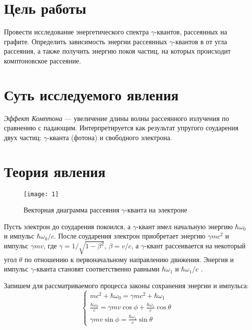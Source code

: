 \documentclass[a4paper, 12pt]{article}
\begin{document}

\section{Цель работы}
Провести исследование энергетического спектра
$\gamma$-квантов, рассеянных на графите. Определить зависимость
энергии рассеянных $\gamma$-квантов в от угла рассеяния, а также
получить энергию покоя частиц, на которых происходит комптоновское
рассеяние.



\section{Суть исследуемого явления}
\emph{Эффект Комптона} --- увеличение длины волны рассеянного
излучения по сравнению с падающим. Интерпретируется как результат
упругого соударения двух частиц: $\gamma$-кванта (фотона) и свободного
электрона.



\section{Теория явления}

\begin{wrapfigure}{r}{0.3\linewidth}
    \texttt{[image: 1]}
    \caption{Векторная диаграмма рассеяния $\gamma$-кванта на
    электроне}
    \label{fig:1}
\end{wrapfigure}


Пусть электрон до соударения покоился, а $\gamma$-квант имел начальную
энергию $\hbar \omega_0$ и импульс $\hbar \omega_0 /c$. После
соударения электрон приобретает энергию $\gamma m c^2$ и импульс
$\gamma m v$, где $\gamma = 1/\sqrt{1-\beta^2}$, $\beta = v/c$, а
$\gamma$-квант рассеивается на некоторый угол $\theta$ по отношению к
первоначальному направлению движения. Энергия и импульс
$\gamma$-кванта становят соответственно равными $\hbar \omega_1$ и
$\hbar \omega_1 /c$ . 

Запишем для рассматриваемого процесса законы сохранения энергии и
импульса:
\begin{equation*}
    \left\{
    \begin{gathered}
        mc^2 + \hbar \omega_0 = \gamma m c^2 + \hbar \omega_1\\
        \frac{\hbar \omega_0}{c} = \gamma m v \cos \phi + \frac{\hbar
        \omega_1}{c} \cos \theta\\
        \gamma m v \sin \phi = \frac{\hbar \omega_1}{c}\sin \theta
    \end{gathered}
    \right.
\end{equation*}
\end{document}
